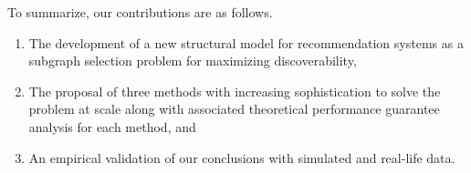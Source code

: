 To summarize, our contributions are as follows.
\begin{enumerate}
\item The development of a new structural model for recommendation systems as a subgraph selection problem for maximizing discoverability, 
\item The proposal of three methods with increasing sophistication to solve the problem at scale along with associated theoretical performance guarantee analysis for each method, and
\item An empirical validation of our conclusions with simulated and real-life data.
\end{enumerate}
